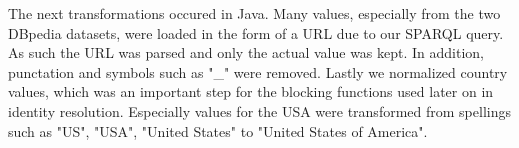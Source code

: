The next transformations occured in Java. Many values, especially from the two DBpedia datasets, were loaded in the form of a URL due to our SPARQL query. As such the URL was parsed and only the actual value was kept. In addition, punctation and symbols such as "\_" were removed. Lastly we normalized country values, which was an important step for the blocking functions used later on in identity resolution. Especially values for the USA were transformed from spellings such as "US", "USA", "United States" to "United States of America".









